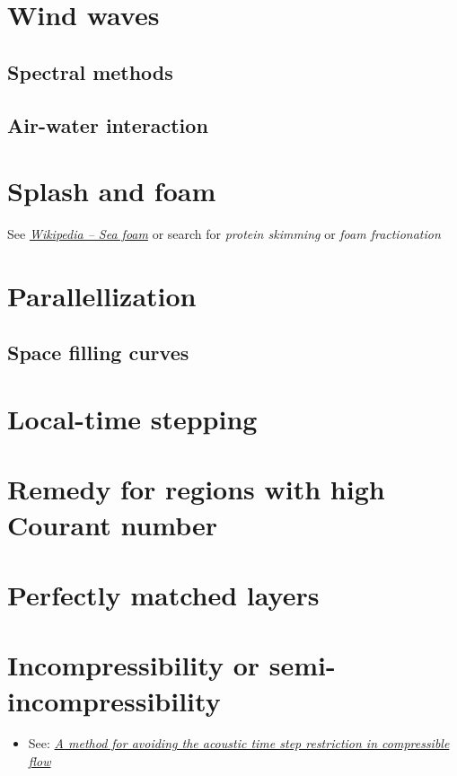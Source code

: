 \documentclass[]{report}
\begin{document}
\section{Wind waves}

\subsection{Spectral methods}

\subsection{Air-water interaction}

\section{Splash and foam}

See \textit{\href{http://en.wikipedia.org/wiki/Sea_foam}{Wikipedia -- Sea foam}} or search for \textit{protein skimming} or \textit{foam fractionation}

\section{Parallellization}

\subsection{Space filling curves}

\section{Local-time stepping}

\section{Remedy for regions with high Courant number}

\section{Perfectly matched layers}

\section{Incompressibility or semi-incompressibility}

\begin{itemize}
    \item See: \textit{\href{http://physbam.stanford.edu/~kwatra/papers/compressible_semi_implicit/compressible_semi_implicit.pdf}{A method for avoiding the acoustic time step restriction in compressible flow}}
\end{itemize}
\end{document}
